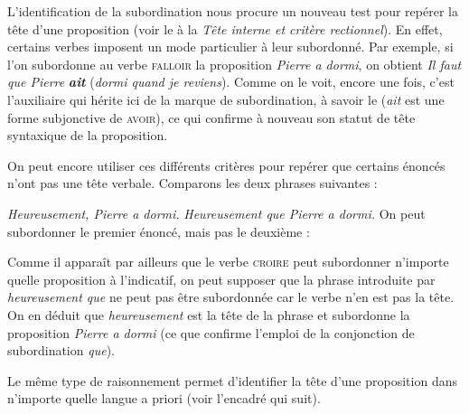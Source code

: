 L’identification de la subordination nous procure un nouveau test pour repérer la tête d’une proposition (voir le  à la  \textit{Tête interne et critère rectionnel}). En effet, certains verbes imposent un mode particulier à leur subordonné. Par exemple, si l’on subordonne au verbe \textsc{falloir} la proposition \textit{Pierre a dormi}, on obtient \textit{Il faut que Pierre} \textbf{\textit{ait}} (\textit{dormi quand je reviens}). Comme on le voit, encore une fois, c’est l’auxiliaire qui hérite ici de la marque de subordination, à savoir le  (\textit{ait} est une forme subjonctive de \textsc{avoir}), ce qui confirme à nouveau son statut de tête syntaxique de la proposition.

On peut encore utiliser ces différents critères pour repérer que certains énoncés n’ont pas une tête verbale. Comparons les deux phrases suivantes :

\ea 
  \ea \textit{Heureusement, Pierre a dormi.}
  \ex \textit{Heureusement que Pierre a dormi.}
  \z
\z
On peut subordonner le premier énoncé, mais pas le deuxième :

\ea\label{ex:heureusement}
  \z
\z
Comme il apparaît par ailleurs que le verbe \textsc{croire} peut subordonner n’importe quelle proposition à l’indicatif, on peut supposer que la phrase  introduite par \textit{heureusement que} ne peut pas être subordonnée car le verbe n’en est pas la tête. On en déduit que \textit{heureusement} est la tête de la phrase et subordonne la proposition \textit{Pierre a dormi} (ce que confirme l’emploi de la conjonction de subordination \textit{que}).\largerpage[2]

Le même type de raisonnement permet d’identifier la tête d’une proposition dans n’importe quelle langue a priori (voir l'encadré qui suit).

